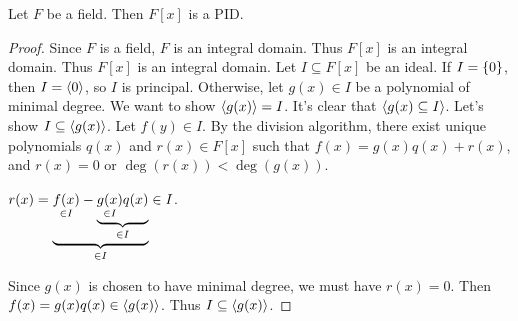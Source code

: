 \documentclass[]{article}
\begin{document}
\begin{theorem}
	Let $F$ be a field. Then $F[x]$ is a PID.
\end{theorem}
\begin{proof}
	Since $F$ is a field, $F$ is an integral domain. Thus $F[x]$ is an integral domain.
	Thus $F[x]$ is an integral domain. Let $I\subseteq F[x]$ be an ideal.
	If $I=\set0$, then $I=\gen0$, so $I$ is principal.
	Otherwise, let $g(x)\in I$ be a polynomial of minimal degree.
	We want to show $\gen{g(x)}=I$. It's clear that $\gen{g(x)\subseteq I}$.
	Let's show $I\subseteq\gen{g(x)}$. Let $f(y)\in I$.
	By the division algorithm, there exist unique polynomials $q(x)$ and $r(x)\in F[x]$ such that $f(x)=g(x)q(x)+r(x)$, and $r(x)=0$ or $\deg(r(x))<\deg(g(x))$.
	\begin{note}
		$r(x)=\ub{\in I}{\us{\in I}{f(x)}-\ub{\in I}{\us{\in I}{g(x)}q(x)}}\in I$.
	\end{note}
	Since $g(x)$ is chosen to have minimal degree, we must have $r(x)=0$.
	Then $f(x)=g(x)q(x)\in\gen{g(x)}$. Thus $I\subseteq\gen{g(x)}$.
\end{proof}

\newpage
\end{document}
